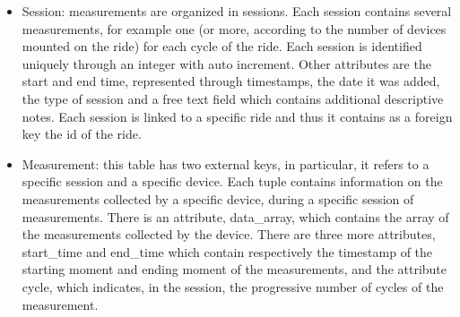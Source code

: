 \begin{itemize}
    \item Session: measurements are organized in sessions. Each session contains several measurements, for example one (or more, according to the number of devices mounted on the ride) for each cycle of the ride. Each session is identified uniquely through an integer with auto increment. Other attributes are the start and end time, represented through timestamps, the date it was added, the type of session and a free text field which contains additional descriptive notes. Each session is linked to a specific ride and thus it contains as a foreign key the id of the ride.
    \item Measurement: this table has two external keys, in particular, it refers to a specific session and a specific device. Each tuple contains information on the measurements collected by a specific device, during a specific session of measurements. There is an attribute, data\_array, which contains the array of the measurements collected by the device. There are three more attributes, start\_time and end\_time which contain respectively the timestamp of the starting moment and ending moment of the measurements, and the attribute cycle, which indicates, in the session, the progressive number of cycles of the measurement.
\end{itemize}